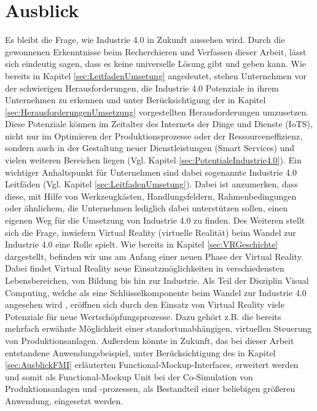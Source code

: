 \section{Ausblick}\label{sec:Ausblick}
Es bleibt die Frage, wie Industrie 4.0 in Zukunft aussehen wird. Durch die gewonnenen Erkenntnisse beim Recherchieren und Verfassen dieser Arbeit, lässt sich eindeutig sagen, dass es keine universelle Lösung gibt und geben kann. Wie bereits in Kapitel \ref{sec:LeitfadenUmsetung} angedeutet, stehen Unternehmen vor der schwierigen Herausforderungen, die Industrie 4.0 Potenziale in ihrem Unternehmen zu erkennen und unter Berücksichtigung der in Kapitel \ref{sec:HerausforderungenUmsetzung} vorgestellten Herausforderungen umzusetzen. Diese Potenziale können im Zeitalter des Internets der Dinge und Dienste (IoTS), nicht nur im Optimieren der Produktionsprozesse oder der Ressourceneffizienz, sondern auch in der Gestaltung neuer Dienstleistungen (Smart Services) und vielen weiteren Bereichen liegen (Vgl. Kapitel \ref{sec:PotentialeIndustrie4.0}). 
Ein wichtiger Anhaltspunkt für Unternehmen sind dabei sogenannte Industrie 4.0 Leitfäden (Vgl. Kapitel \ref{sec:LeitfadenUmsetung}). Dabei ist anzumerken, dass diese, mit Hilfe von Werkzeugkästen, Handlungsfeldern, Rahmenbedingungen oder ähnlichem, die Unternehmen lediglich dabei unterstützen sollen, einen eigenen Weg für die Umsetzung von Industrie 4.0 zu finden.
\newline
Des Weiteren stellt sich die Frage, inwiefern Virtual Reality (virtuelle Realität) beim Wandel zur Industrie 4.0 eine Rolle spielt. Wie bereits in Kapitel \ref{sec:VRGeschichte} dargestellt, befinden wir uns am Anfang einer neuen Phase der Virtual Reality. Dabei findet Virtual Reality neue Einsatzmöglichkeiten in verschiedensten Lebensbereichen, von Bildung bis hin zur Industrie. Als Teil der Disziplin Visual Computing, welche als eine Schlüsselkomponente beim Wandel zur Industrie 4.0 angesehen wird \cite[S.1]{17}, eröffnen sich durch den Einsatz von Virtual Reality viele Potenziale für neue Wertschöpfungsprozesse. Dazu gehört z.B. die bereits mehrfach erwähnte Möglichkeit einer standortunabhängigen, virtuellen Steuerung von Produktionsanlagen.
\newline
Außerdem könnte in Zukunft, das bei dieser Arbeit entstandene Anwendungsbeispiel, unter Berücksichtigung des in Kapitel \ref{sec:AusblickFMI} erläuterten Functional-Mockup-Interfaces, erweitert werden und somit als Functional-Mockup Unit bei der Co-Simulation von Produktionsanlagen und -prozessen, als Bestandteil einer beliebigen größeren Anwendung, eingesetzt werden.
